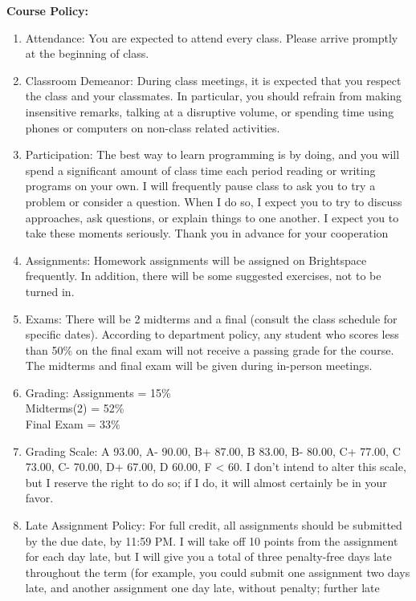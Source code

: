 \documentclass[a4paper]{article}
\begin{document}
\newpage
\textbf{Course Policy:}
\begin{enumerate}
    \item Attendance: You are expected to attend every class. Please arrive promptly at the beginning of
    class.
    \item Classroom Demeanor: During class meetings, it is expected that you respect the class and your
    classmates. In particular, you should refrain from making insensitive remarks, talking at a
    disruptive volume, or spending time using phones or computers on non-class related activities.
    \item Participation: The best way to learn programming is by doing, and you will spend a significant
    amount of class time each period reading or writing programs on your own. I will frequently
    pause class to ask you to try a problem or consider a question. When I do so, I expect you to try
    to discuss approaches, ask questions, or explain things to one another. I expect you to take these
    moments seriously. Thank you in advance for your cooperation
    \item Assignments: Homework assignments will be assigned on Brightspace frequently. In addition,
    there will be some suggested exercises, not to be turned in.
    \item Exams: There will be 2 midterms and a final (consult the class schedule for specific dates).
    According to department policy, any student who scores less than 50\% on the final exam will
    not receive a passing grade for the course. The midterms and final exam will be given
    during in-person meetings.
    \item Grading:
    Assignments = 15\% \\
    Midterms(2) = 52\% \\ 
    Final Exam = 33\%
    \item Grading Scale: A 93.00, A- 90.00, B+ 87.00, B 83.00, B- 80.00, C+ 77.00, C 73.00, C- 70.00, D+
    67.00, D 60.00, F < 60. I don’t intend to alter this scale, but I reserve the right to do so; if I do,
    it will almost certainly be in your favor.
    \item Late Assignment Policy: For full credit, all assignments should be submitted by the due date, by
    11:59 PM. I will take off 10 points from the assignment for each day late, but I will give you a
    total of three penalty-free days late throughout the term (for example, you could submit one
    assignment two days late, and another assignment one day late, without penalty; further late

\end{enumerate}
\end{document}
